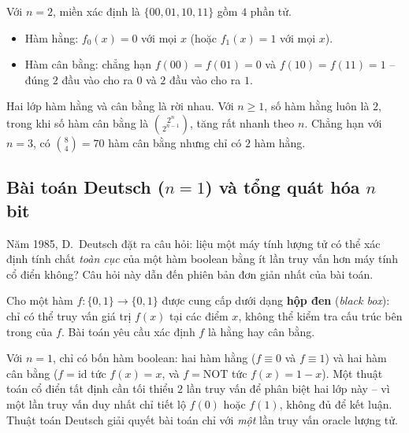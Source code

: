 \begin{example}[Minh họa với $n=2$]
\label{ex:const-balanced-n2}
Với $n=2$, miền xác định là $\{00, 01, 10, 11\}$ gồm $4$ phần tử.
\begin{itemize}
    \item Hàm hằng: $f_0(x) = 0$ với mọi $x$ (hoặc $f_1(x) = 1$ với mọi $x$).
    \item Hàm cân bằng: chẳng hạn $f(00)=f(01)=0$ và $f(10)=f(11)=1$ --
          đúng $2$ đầu vào cho ra $0$ và $2$ đầu vào cho ra $1$.
\end{itemize}

\end{example}

\begin{remark}
Hai lớp hàm hằng và cân bằng là rời nhau. Với $n \geq 1$, số hàm hằng luôn
là $2$, trong khi số hàm cân bằng là $\binom{2^n}{2^{n-1}}$, tăng rất nhanh
theo $n$. Chẳng hạn với $n=3$, có $\binom{8}{4} = 70$ hàm cân bằng nhưng
chỉ có $2$ hàm hằng.
\end{remark}

\subsection*{Bài toán Deutsch ($n=1$) và tổng quát hóa $n$ bit}

Năm 1985, D.\ Deutsch \cite{ref1} đặt ra câu hỏi: liệu một máy tính lượng tử
có thể xác định tính chất \emph{toàn cục} của một hàm boolean bằng ít lần truy
vấn hơn máy tính cổ điển không? Câu hỏi này dẫn đến phiên bản đơn giản nhất
của bài toán.

\begin{definition}
\label{def:deutsch-problem}
Cho một hàm $f \colon \{0,1\} \to \{0,1\}$ được cung cấp dưới dạng
\textbf{hộp đen} (\textit{black box}): chỉ có thể truy vấn giá trị $f(x)$ tại
các điểm $x$, không thể kiểm tra cấu trúc bên trong của $f$. Bài toán yêu cầu
xác định $f$ là hằng hay cân bằng.
\end{definition}

\begin{remark}
Với $n=1$, chỉ có bốn hàm boolean: hai hàm hằng ($f \equiv 0$ và $f \equiv 1$)
và hai hàm cân bằng ($f = \mathrm{id}$ tức $f(x)=x$, và $f = \mathrm{NOT}$ tức
$f(x)=1-x$). Một thuật toán cổ điển tất định cần tối thiểu $2$ lần truy vấn để
phân biệt hai lớp này -- vì một lần truy vấn duy nhất chỉ tiết lộ $f(0)$ hoặc
$f(1)$, không đủ để kết luận. Thuật toán Deutsch \cite{ref1} giải quyết bài toán
chỉ với \emph{một} lần truy vấn oracle lượng tử.
\end{remark}

